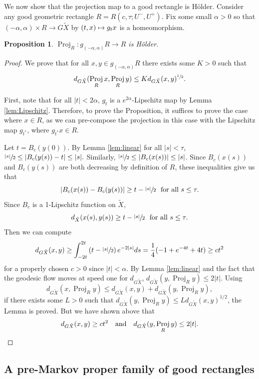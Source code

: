 \documentclass[10pt]{amsart}
\def\mto{\mathchoice{\longmapsto}{\mapsto}{\mapsto}{\mapsto}}
\newtheorem{prop}[thm]{Proposition}
\theoremstyle{definition}
\numberwithin{equation}{section}
\DeclareMathOperator{\Proj}{Proj}
\begin{document}
We now show that the projection map to a good rectangle is Hölder. Consider any good geometric rectangle $R=R(c,\tau; U^-, U^+)$. Fix some small $\alpha>0$ so that $(-\alpha, \alpha) \times R \to G\tilde X$ by $(t,x) \mto g_t x$ is a homeomorphism.

\begin{prop} \label{projholder}
$\Proj_R:g_{(-\alpha, \alpha)}R \to R$ is Hölder.
\end{prop}

\begin{proof}
We prove that for all $x,y\in g_{(-\alpha, \alpha)}R$ there exists some $K>0$ such that
\[ d_{G\tilde X} (\Proj_Rx, \Proj_Ry) \leq K d_{G\tilde X}(x,y)^{\sfrac{1}{2}}.\]

First, note that for all $|t|<2\alpha$, $g_t$ is a $e^{2\alpha}$-Lipschitz map by Lemma \ref{lem:Lipschitz}. Therefore, to prove the Proposition, it suffices to prove the case where $x\in R$, as we can pre-compose the projection in this case with the Lipschitz map $g_{t^*}$, where $g_{t^*}x\in R$.

Let $t=B_c(y(0))$. By Lemma \ref{lem:linear} for all $|s|<\tau$, $\sfrac{|s|}{2} \leq |B_c(y(s))-t| \leq |s|.$ Similarly, $\sfrac{|s|}{2} \leq |B_c(x(s))| \leq |s|$. Since $B_c(x(s))$ and $B_c(y(s))$ are both decreasing by definition of $R$, these inequalities give us that
\[ |B_c(x(s)) - B_c(y(s))| \geq t-\sfrac{|s|}{2} \ \mbox{ for all } s\leq \tau.\]
Since $B_c$ is a 1-Lipschitz function on $\tilde X$,
\[ d_{\tilde X}(x(s), y(s)) \geq t-\sfrac{|s|}{2} \ \mbox{ for all } s\leq \tau. \]
Then we can compute
\[ d_{G\tilde X}(x,y) \geq \int_{-2t}^{2t} \left(t-\sfrac{|s|}{2}\right) e^{-2|s|} ds = \frac{1}{4}(-1+e^{-4t}+4t) \geq c t^2\]
for a properly chosen $c>0$ since $|t|<\alpha$. By Lemma \ref{lem:linear} and the fact that the geodesic flow moves at speed one for $d_{G\tilde X}$, $d_{G\tilde X}(y,\Proj_Ry) \leq 2|t|$. Using
\[
d_{G\tilde X}(x, \Proj_Ry) \leq d_{G\tilde X}(x,y) + d_{G\tilde X}(y,\Proj_Ry),
\]
if there exists some $L>0$ such that $d_{G\tilde X}(y,\Proj_Ry) \leq Ld_{G\tilde X}(x,y)^{1/2}$, the Lemma is proved. But we have shown above that
\[
d_{G\tilde X}(x,y) \geq ct^2\quad\text{and}\quad d_{G\tilde X} (y, \Proj_Ry)\leq 2|t|.\qedhere
\]
\end{proof}

\subsection{A pre-Markov proper family of good rectangles}\label{sec:good markov}
\end{document}
